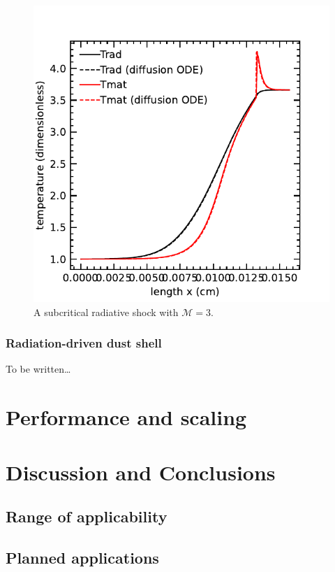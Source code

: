 \documentclass[fleqn,usenatbib]{mnras}
\begin{document}
\begin{figure}
    \includegraphics[width=\columnwidth]{radshock_cgs_temperature.pdf}
    \caption{A subcritical radiative shock with $\mathcal{M} = 3$.}
    \label{fig:radshock}
\end{figure}

\subsubsection{Radiation-driven dust shell}
To be written\dots

\section{Performance and scaling}
\label{section:performance}

\section{Discussion and Conclusions}
\label{section:discussion}
\subsection{Range of applicability}
\subsection{Planned applications}
\end{document}

